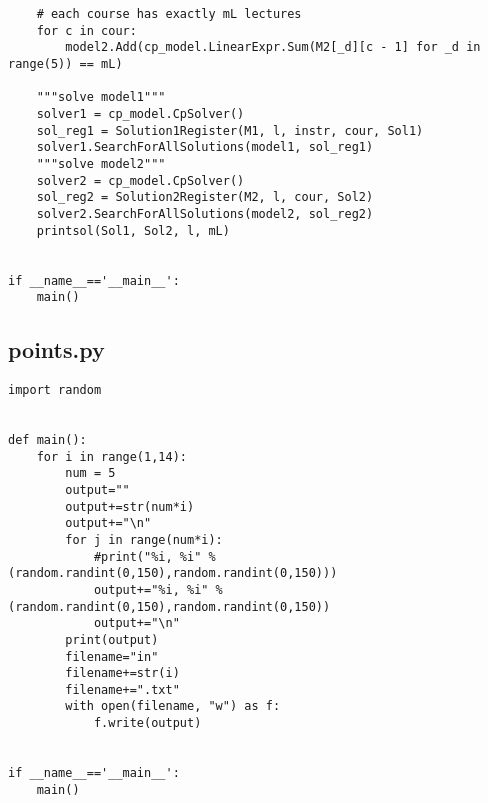 \documentclass{article}
\begin{document}
\begin{verbatim}
    # each course has exactly mL lectures
    for c in cour:
        model2.Add(cp_model.LinearExpr.Sum(M2[_d][c - 1] for _d in range(5)) == mL)

    """solve model1"""
    solver1 = cp_model.CpSolver()
    sol_reg1 = Solution1Register(M1, l, instr, cour, Sol1)
    solver1.SearchForAllSolutions(model1, sol_reg1)
    """solve model2"""
    solver2 = cp_model.CpSolver()
    sol_reg2 = Solution2Register(M2, l, cour, Sol2)
    solver2.SearchForAllSolutions(model2, sol_reg2)
    printsol(Sol1, Sol2, l, mL)


if __name__=='__main__':
    main()

\end{verbatim}
\subsection*{points.py}
\begin{verbatim}
import random


def main():
    for i in range(1,14):
        num = 5
        output=""
        output+=str(num*i)
        output+="\n"
        for j in range(num*i):
            #print("%i, %i" %(random.randint(0,150),random.randint(0,150)))
            output+="%i, %i" %(random.randint(0,150),random.randint(0,150))
            output+="\n"
        print(output)
        filename="in"
        filename+=str(i)
        filename+=".txt"
        with open(filename, "w") as f:
            f.write(output)


if __name__=='__main__':
    main()

\end{verbatim}
\end{document}
